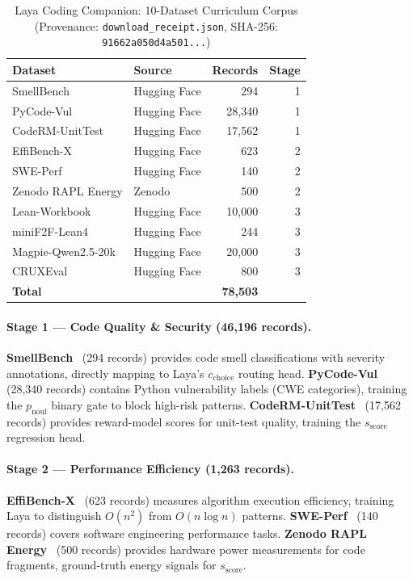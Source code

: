 \documentclass[conference]{IEEEtran}
\begin{document}
\begin{table}[htbp]
\centering
\caption{Laya Coding Companion: 10-Dataset Curriculum Corpus\\
(Provenance: \texttt{download\_receipt.json}, SHA-256: \texttt{91662a050d4a501...})}
\label{tab:datasets}
\begin{tabular}{@{}llrr@{}}
\toprule
\textbf{Dataset} & \textbf{Source} & \textbf{Records} & \textbf{Stage} \\
\midrule
SmellBench               & Hugging Face & 294    & 1 \\
PyCode-Vul               & Hugging Face & 28{,}340 & 1 \\
CodeRM-UnitTest          & Hugging Face & 17{,}562 & 1 \\
\midrule
EffiBench-X              & Hugging Face & 623    & 2 \\
SWE-Perf                 & Hugging Face & 140    & 2 \\
Zenodo RAPL Energy       & Zenodo       & 500    & 2 \\
\midrule
Lean-Workbook            & Hugging Face & 10{,}000 & 3 \\
miniF2F-Lean4            & Hugging Face & 244    & 3 \\
Magpie-Qwen2.5-20k       & Hugging Face & 20{,}000 & 3 \\
CRUXEval                 & Hugging Face & 800    & 3 \\
\midrule
\textbf{Total}           &              & \textbf{78{,}503} & \\
\bottomrule
\end{tabular}
\end{table}

\paragraph{Stage 1 — Code Quality \& Security (46{,}196 records).}
\textbf{SmellBench}~\cite{tambon2024smellbench} (294 records) provides code smell
classifications with severity annotations, directly mapping to Laya's $c_\text{choice}$ routing head.
\textbf{PyCode-Vul}~\cite{ni2024pycodevul} (28{,}340 records) contains Python vulnerability
labels (CWE categories), training the $p_\text{noul}$ binary gate to block high-risk patterns.
\textbf{CodeRM-UnitTest}~\cite{coderm2024} (17{,}562 records) provides reward-model scores
for unit-test quality, training the $s_\text{score}$ regression head.

\paragraph{Stage 2 — Performance Efficiency (1{,}263 records).}
\textbf{EffiBench-X}~\cite{huang2024effibench} (623 records) measures algorithm execution efficiency,
training Laya to distinguish $O(n^2)$ from $O(n \log n)$ patterns.
\textbf{SWE-Perf}~\cite{sweperf2024} (140 records) covers software engineering performance tasks.
\textbf{Zenodo RAPL Energy}~\cite{zenodorapl2024} (500 records) provides hardware power
measurements for code fragments, ground-truth energy signals for $s_\text{score}$.
\end{document}
